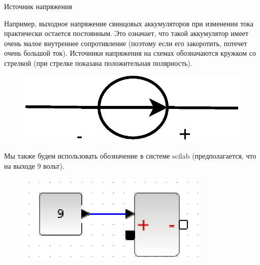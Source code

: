 \documentclass[12pt, pdf, hyperref={unicode},handout]{beamer}
\begin{document}
\begin{frame}{ Источник напряжения}
  \begin{block}

    \small{
      Например, выходное напряжение свинцовых аккумуляторов при изменении тока практически остается постоянным. Это означает, что такой аккумулятор имеет очень малое внутреннее сопротивление (поэтому если его закоротить, потечет очень большой ток). Источники напряжения на схемах обозначаются кружком со стрелкой (при стрелке показана положительная полярность).      
      \begin{figure}[htb] 
    \centering
    \includegraphics [scale=0.7]{ris4.eps}
  \end{figure}

  Мы также будем использовать обозначение в системе scilab (предполагается, что на выходе 9 вольт).
  \begin{figure}[htb] 
    \centering
    \includegraphics [scale=1]{ris5.eps}
  \end{figure}

  
}

  \end{block}
  
\end{frame}
\end{document}
